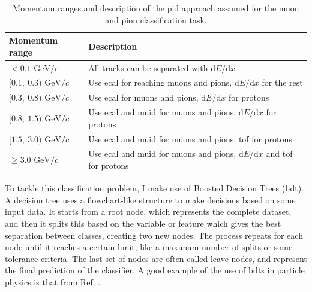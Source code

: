 \begin{table}[t]
	\caption{Momentum ranges and description of the \gls{pid} approach assumed for the muon and pion classification task.}
	\begin{center}
		\begin{small}
			\begin{tabular}{p{2.7cm}|l}
				Momentum range                                    & Description                                                                          \\[1mm] \hline \rule{0pt}{1.1\normalbaselineskip}
				$< 0.1$ \hfill $\mathrm{GeV}/c$      & All tracks can be separated with $\mathrm{d}E/\mathrm{d}x$                           \\[2mm]
				$[0.1,~0.3)$ \hfill $\mathrm{GeV}/c$ & Use \gls{ecal} for reaching muons and pions, $\mathrm{d}E/\mathrm{d}x$ for the rest        \\[2mm]
				$[0.3,~0.8)$ \hfill $\mathrm{GeV}/c$ & Use \gls{ecal} for muons and pions, $\mathrm{d}E/\mathrm{d}x$ for protons                  \\[2mm]
				$[0.8,~1.5)$ \hfill $\mathrm{GeV}/c$ & Use \gls{ecal} and \gls{muid} for muons and pions,  $\mathrm{d}E/\mathrm{d}x$ for protons        \\[2mm]
				$[1.5,~3.0)$ \hfill $\mathrm{GeV}/c$ & Use \gls{ecal} and \gls{muid} for muons and pions, \gls{tof} for protons                               \\[2mm]
				$\geq 3.0$ \hfill $\mathrm{GeV}/c$   & Use \gls{ecal} and \gls{muid} for muons and pions, $\mathrm{d}E/\mathrm{d}x$ and \gls{tof} for protons
			\end{tabular}
		\end{small}
	\end{center}
	\label{tab:bdt_regions}
\end{table}

To tackle this classification problem, I make use of Boosted Decision Trees (\gls{bdt}). A decision tree uses a flowchart-like structure to make decisions based on some input data. It starts from a root node, which represents the complete dataset, and then it splits this based on the variable or feature which gives the best separation between classes, creating two new nodes. The process repeats for each node until it reaches a certain limit, like a maximum number of splits or some tolerance criteria. The last set of nodes are often called leave nodes, and represent the final prediction of the classifier. A good example of the use of \gls{bdt}s in particle physics is that from Ref. \cite{Cornell2021}.

